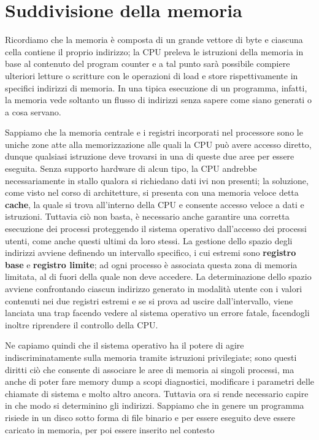 \section{Suddivisione della memoria}
Ricordiamo che la memoria è composta di un grande vettore di byte e ciascuna cella contiene il proprio indirizzo; la CPU preleva le istruzioni della
memoria in base al contenuto del program counter e a tal punto sarà possibile compiere ulteriori letture o scritture con le operazioni di load e store
rispettivamente in specifici indirizzi di memoria. In una tipica esecuzione di un programma, infatti, la memoria vede soltanto un flusso di indirizzi
senza sapere come siano generati o a cosa servano.\par
Sappiamo che la memoria centrale e i registri incorporati nel processore sono le uniche zone atte alla memorizzazione alle quali la CPU può avere
accesso diretto, dunque qualsiasi istruzione deve trovarsi in una di queste due aree per essere eseguita. Senza supporto hardware di alcun tipo, la
CPU andrebbe necessariamente in stallo qualora si richiedano dati ivi non presenti; la soluzione, come visto nel corso di architetture, si presenta
con una memoria veloce detta \textbf{cache}, la quale si trova all'interno della CPU e consente accesso veloce a dati e istruzioni. Tuttavia ciò non
basta, è necessario anche garantire una corretta esecuzione dei processi proteggendo il sistema operativo dall'accesso dei processi utenti, come anche
questi ultimi da loro stessi. La gestione dello spazio degli indirizzi avviene definendo un intervallo specifico, i cui estremi sono \textbf{registro
base} e \textbf{registro limite}; ad ogni processo è associata questa zona di memoria limitata, al di fuori della quale non deve accedere. La
determinazione dello spazio avviene confrontando ciascun indirizzo generato in modalità utente con i valori contenuti nei due registri estremi e se si
prova ad uscire dall'intervallo, viene lanciata una trap facendo vedere al sistema operativo un errore fatale, facendogli inoltre riprendere il
controllo della CPU.\par
Ne capiamo quindi che il sistema operativo ha il potere di agire indiscriminatamente sulla memoria tramite istruzioni privilegiate; sono questi diritti
ciò che consente di associare le aree di memoria ai singoli processi, ma anche di poter fare memory dump a scopi diagnostici, modificare i parametri
delle chiamate di sistema e molto altro ancora. Tuttavia ora si rende necessario capire in che modo si determinino gli indirizzi. Sappiamo che in genere
un programma risiede in un disco sotto forma di file binario e per essere eseguito deve essere caricato in memoria, per poi essere inserito nel contesto
